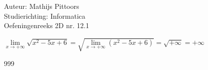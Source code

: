 \documentclass[a4paper]{article}
\newcommand{\llim}{\lim\limits}
\begin{document}
  
\noindent \large Auteur: Mathijs Pittoors \\
\noindent \large Studierichting: Informatica\\
\noindent \large Oefeningenreeks 2D nr. 12.1\\

\medskip

\normalsize

$\llim_{x \rightarrow + \infty} \sqrt{x^2-5x+6} = \sqrt{ \llim_{x \rightarrow + \infty} \left(x^2-5x+6\right)} = \sqrt{+\infty} = + \infty$

\begin{thebibliography}{999}
\end{thebibliography}
\end{document}
